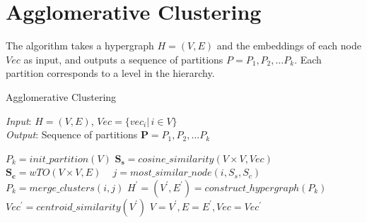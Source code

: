 \section{Agglomerative Clustering}
The algorithm takes a hypergraph $H=(V, E)$ and the embeddings of each node $Vec$ as input, and outputs a sequence of partitions $P=P_1, P_2, \dots P_k$.
Each partition corresponds to a level in the hierarchy.
\begin{algorithm}\label{alg: clustering}
    \caption{Agglomerative Clustering }\label{alg:cap}
    \hspace*{\algorithmicindent} \textit{Input}: $H=(V, E)$, $Vec=\{vec_i |\, i \in V\}$ \\
    \hspace*{\algorithmicindent} \textit{Output}: Sequence of partitions $\mathbf{P}=P_1, P_2, \dots P_k$ \\
    \begin{algorithmic}[1]
        \State$P_k = init\_partition(V)$ 
        \State$\mathbf{S_s} = cosine\_similarity(V\times V, Vec)$ 
        \State$\mathbf{S_c} = wTO(V\times V, E)$ \
            \State$j = most\_similar\_node(i, S_s, S_c)$ 
            \State$P_k = merge\_clusters(i, j)$ 
        \EndFor
        \State$H^\prime=(V^\prime, E^\prime) = construct\_hypergraph(P_k)$ 
        \State$Vec^\prime = centroid\_similarity(V^\prime)$
        \State$V=V^\prime, E=E^\prime, Vec=Vec^\prime$ 
    \EndWhile
    \end{algorithmic}
\end{algorithm}

